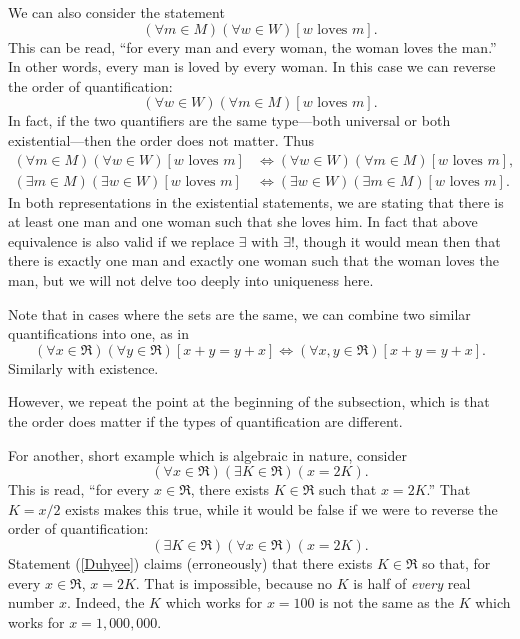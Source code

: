 We can also consider the statement
\begin{equation}(\forall m\in M)(\forall w\in W)[w\text{ loves }m].
\label{ForallMenForallWomen}\end{equation}
This can be read, ``for every man and every woman, the woman loves the man.''
In other words, every man is loved by every woman.  In this case
we can reverse the order of quantification:
\begin{equation}(\forall w\in W)(\forall m\in M)[w\text{ loves }m].
\label{ForallWomenForallMen}\end{equation}
In fact, if the two quantifiers are the same type---both universal
or both existential---then the order does not matter.
Thus
\begin{align*}
(\forall m\in M)(\forall w\in W)[w\text{ loves }m]
       &\iff (\forall w\in W)(\forall m\in M)[w\text{ loves }m],\\
(\exists m\in M)(\exists w\in W)[w\text{ loves }m]
       &\iff (\exists w\in W)(\exists m\in M)[w\text{ loves }m].
\end{align*}
In both representations in the existential
statements, we are stating that there is at least one man and
one woman such that she loves him.  In fact that above equivalence
is also valid if we replace $\exists$ with $\exists !$, though
it would mean then that there is exactly one man and exactly one woman
such that the woman loves the man, but we will not delve too deeply
into uniqueness here.

Note that in cases where the sets are the same, we can combine 
two similar quantifications into one, as in
\begin{equation}
(\forall x\in\Re)(\forall y\in\Re)[x+y=y+x]
\iff (\forall x,y\in\Re)[x+y=y+x].\end{equation}
Similarly with existence.  

However, we repeat the point at the beginning of the subsection,
which is that the order does matter if the types of quantification
are different.


For another, short  example which is algebraic in nature, consider
\begin{equation}
(\forall x\in\Re)(\exists K\in\Re)(x=2K).
\end{equation}
This is read, ``for every $x\in\Re$, there exists $K\in\Re$
such that $x=2K$.''  
That $K=x/2$ exists makes this true,
while it would be false if we were to reverse the
order of quantification:
\begin{equation}(\exists K\in\Re)(\forall x\in\Re)(x=2K).\label{Duhyee}
\end{equation}
Statement (\ref{Duhyee}) claims (erroneously) that there exists $K\in\Re$
so that, for every $x\in\Re$, $x=2K$.  That is impossible, because
no $K$ is half of {\it every} real number $x$.  Indeed, the $K$
which works for $x=100$ is not the same as the $K$ which works
for $x=1,000,000$.









